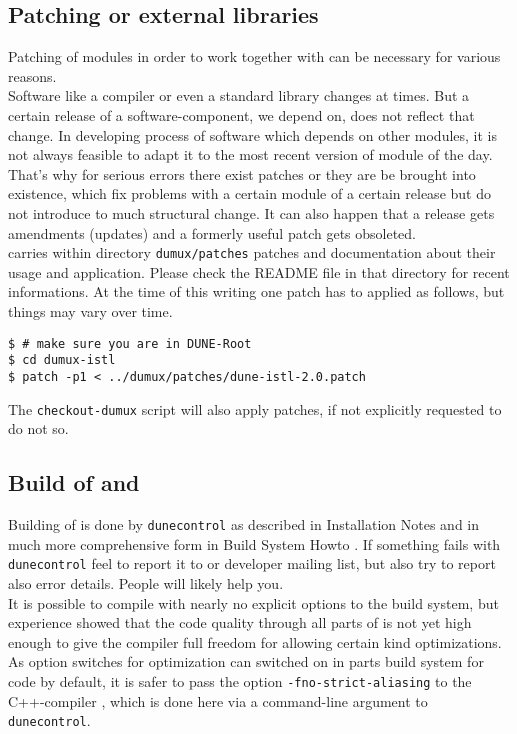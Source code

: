 \subsection{Patching \Dune or external libraries}
Patching of \Dune modules in order to work together with \Dumux
can be necessary for various reasons. \\

Software like a compiler or even a standard library
changes at times. But a certain release of a software-component, we depend on, does not reflect that change.
In developing process of software which depends on other modules, it is not always feasible 
to adapt it to the most recent version of module of the day. That's why for serious errors 
there exist patches or they are be brought into existence, which fix problems with a certain module
of a certain release but do not introduce to much structural change. It can also happen 
that a release gets amendments (updates) and a formerly useful patch gets obsoleted.\\

\Dumux carries within directory \texttt{dumux/patches} patches and documentation about their usage and application.
Please check the README file in that directory for recent informations. 
At the time of this writing one patch has to applied as follows, but things may vary over time.

\begin{lstlisting}[style=Bash]
$ # make sure you are in DUNE-Root
$ cd dumux-istl
$ patch -p1 < ../dumux/patches/dune-istl-2.0.patch
\end{lstlisting}

The \texttt{checkout-dumux} script will also apply patches, if not explicitly requested to do not so.

\subsection{Build of \Dune and \Dumux}
\label{buildIt}
Building of \Dune is done by \texttt{dunecontrol} as described in \Dune Installation Notes \cite{DUNE-INST}
and in much more comprehensive form in \Dune Build System Howto \cite{DUNE-BS}.
If something fails with \texttt{dunecontrol} feel to report it to \Dune or \Dumux developer mailing list,
but also try to report also error details. People will likely help you.\\

It is possible to compile \Dumux with nearly no explicit options to the build system, but
experience showed that the code quality through all parts of \Dune is not yet high enough to give the compiler full 
freedom for allowing certain kind optimizations. As option switches for optimization can switched on in parts
build system for code by default, it is safer to pass the option \texttt{-fno-strict-aliasing} to the C++-compiler
\cite{WIKIPED-ALIASING}, which is done here via a command-line argument to \texttt{dunecontrol}.


